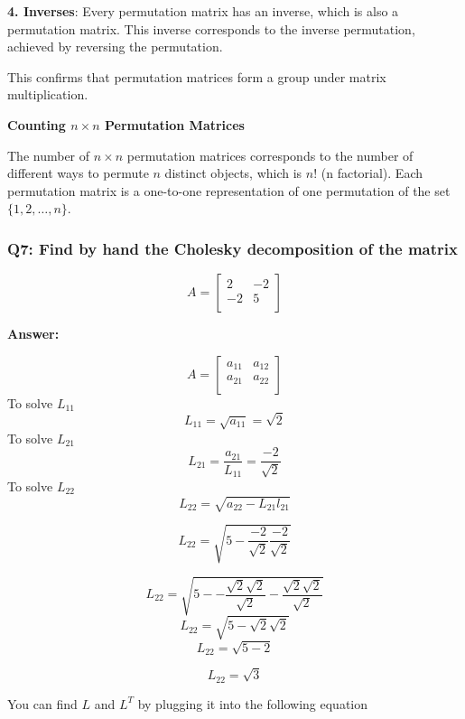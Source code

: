\documentclass{article}
\begin{document}
\textbf{4. Inverses}: Every permutation matrix has an inverse, which is also a permutation matrix. This inverse corresponds to the inverse permutation, achieved by reversing the permutation.

This confirms that permutation matrices form a group under matrix multiplication.

\textbf{Counting \(n \times n\) Permutation Matrices}

The number of \(n \times n\) permutation matrices corresponds to the number of different ways to permute \(n\) distinct objects, which is \(n!\) (n factorial). Each permutation matrix is a one-to-one representation of one permutation of the set \(\{1, 2, \ldots, n\}\).



\subsubsection*{Q7: Find by hand the Cholesky decomposition of the matrix}
 \[
   A=
  \left[ {\begin{array}{cc}
   2 & -2 \\
   -2 & 5 \\
  \end{array} } \right]
\]

\textbf{Answer:}

 \[
   A=
  \left[ {\begin{array}{cc}
   a_{11} & a_{12} \\
   a_{21} & a_{22} \\
  \end{array} } \right]
\]
To solve $L_{11}$
\[
L_{11} = \sqrt{a_{11}} = \sqrt{2}
\]
To solve $L_{21}$
\[
L_{21} = \frac{a_{21}}{L_{11}} = \frac{-2}{\sqrt{2}}
\]
To solve $L_{22}$
\[
L_{22} = \sqrt{a_{22} - L_{21}l_{21}}
\]

\[
L_{22} = \sqrt{5 - \frac{-2}{\sqrt{2}} \frac{-2}{\sqrt{2}}}
\]

\[
L_{22} = \sqrt{5 - -\frac{\sqrt{2}\sqrt{2}}{\sqrt{2}} -\frac{\sqrt{2}\sqrt{2}}{\sqrt{2}}}
\]
\[
L_{22} = \sqrt{5 - \sqrt{2}\sqrt{2}}
\]
\[
L_{22} = \sqrt{5 - 2}
\]

\[
L_{22} = \sqrt{3}
\]

You can find $L$ and $L^T$ by plugging it into the following equation 
\end{document}
